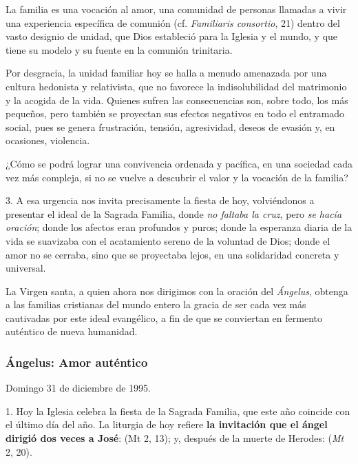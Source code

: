 La familia es una vocación al amor, una comunidad de personas llamadas a vivir una experiencia específica de comunión (cf. \emph{Familiaris consortio}, 21) dentro del vasto designio de unidad, que Dios estableció para la Iglesia y el mundo, y que tiene su modelo y su fuente en la comunión trinitaria.

Por desgracia, la unidad familiar hoy se halla a menudo amenazada por una cultura hedonista y relativista, que no favorece la indisolubilidad del matrimonio y la acogida de la vida. Quienes sufren las consecuencias son, sobre todo, los más pequeños, pero también se proyectan sus efectos negativos en todo el entramado social, pues se genera frustración, tensión, agresividad, deseos de evasión y, en ocasiones, violencia.

¿Cómo se podrá lograr una convivencia ordenada y pacífica, en una sociedad cada vez más compleja, si no se vuelve a descubrir el valor y la vocación de la familia?

3. A esa urgencia nos invita precisamente la fiesta de hoy, volviéndonos a presentar el ideal de la Sagrada Familia, donde \emph{no faltaba la cruz}, pero \emph{se hacía oración}; donde los afectos eran profundos y puros; donde la esperanza diaria de la vida se suavizaba con el acatamiento sereno de la voluntad de Dios; donde el amor no se cerraba, sino que se proyectaba lejos, en una solidaridad concreta y universal.

La Virgen santa, a quien ahora nos dirigimos con la oración del \emph{Ángelus}, obtenga a las familias cristianas del mundo entero la gracia de ser cada vez más cautivadas por este ideal evangélico, a fin de que se conviertan en fermento auténtico de nueva humanidad.

\subsubsection{Ángelus: Amor auténtico}

Domingo 31 de diciembre de 1995.

1. Hoy la Iglesia celebra la fiesta de la Sagrada Familia, que este año coincide con el último día del año. La liturgia de hoy refiere \textbf{la invitación que el ángel dirigió dos veces a José}:  (Mt 2, 13); y, después de la muerte de Herodes:  (\emph{Mt} 2, 20).

